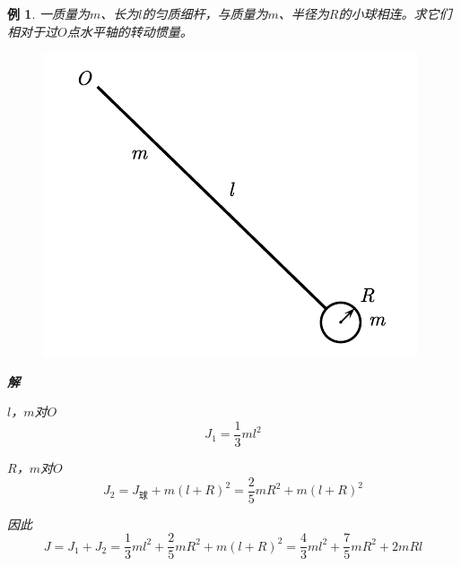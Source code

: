 \documentclass[12pt, a4paper, twoside]{ctexbook}
\newtheorem{example}[theorem]{例}
\begin{document}
\begin{example}
    一质量为$m$、长为$l$的匀质细杆，与质量为$m$、半径为$R$的小球相连。求它们相对于过$O$点水平轴的转动惯量。
    \begin{figure}[H]
        \centerline{\includegraphics[scale=0.8]{CH03EX01.pdf}}
    \end{figure}
    \noindent\textbf{解}

    $l$，$m$对$O$
    $$
    J_1=\frac{1}{3}ml^2
    $$

    $R$，$m$对$O$
    $$
    J_2=J_{\text{球}}+m\left(l+R\right)^2=\frac{2}{5}mR^2+m\left(l+R\right)^2
    $$

    因此
    $$
    J=J_1+J_2=\frac{1}{3}ml^2+\frac{2}{5}mR^2+m\left(l+R\right)^2=\frac{4}{3}ml^2+\frac{7}{5}mR^2+2mRl
    $$
\end{example}
\end{document}
